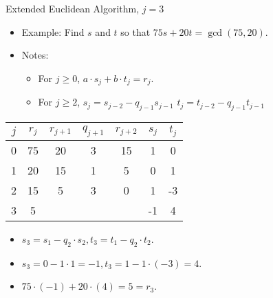 \documentclass[handout]{beamer}
\begin{document}
\begin{frame}{Extended Euclidean Algorithm, $j=3$}

\begin{itemize}
  \item Example: Find $s$ and $t$ so that $75s+20t = \gcd(75, 20)$.
  \item Notes:
  \begin{itemize}
    \item For $j\geq0$, $a \cdot s_j + b \cdot t_j = r_j$.
    \item For $j\geq 2$, $s_j=s_{j-2} - q_{j-1}s_{j-1}$ \quad $t_j=t_{j-2} - q_{j-1}t_{j-1}$
  \end{itemize}
\end{itemize}

\vspace{1em}

\begin{tabular}{|c|c|c|c|c|c|c|}\hline
$j$   &  $r_{j}$    & $r_{j+1}$ & $q_{j+1}$ & $r_{j+2}$ & $s_j$ & $t_j$ \\ \hline\hline
0     &  75         &  20       &    3      &   15      &  1    &   0   \\ \hline
1     &  20         &  15       &    1      &    5      &  0    &   1   \\ \hline
2     &  15         &   5       &    3      &    0      &  1    &  -3   \\ \hline
3     &   5         &           &           &           & -1    &   4   \\ \hline
\end{tabular}

\vspace{1em}

\begin{itemize}
  \item $s_3 = s_1 - q_2 \cdot s_2, t_3 = t_1 - q_2 \cdot t_2$.
  \item $s_3 =0 - 1 \cdot 1 = -1, t_3 = 1 - 1 \cdot (-3) = 4$.
  \item $75\cdot (-1) + 20 \cdot (4) = 5 = r_3$.
\end{itemize}

\end{frame}
\end{document}
